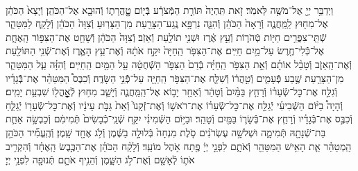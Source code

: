 \documentclass[twoside, openany, parskip=half, 11pt]{book}
\begin{document}
\begin{footnotesize}
\begin{multicols}{2}
\\
וַיְדַבֵּ֥ר יְיָ֖ אֶל־מֹשֶׁ֥ה לֵּאמֹֽר׃ זֹ֤את תִּֽהְיֶה֙ תּוֹרַ֣ת הַמְּֿצֹרָ֔ע בְּֿי֖וֹם טׇׇׇׇׇׇׇׇׇׇׇׇׇׇָֽהֳרָת֑וֹ וְֿהוּבָ֖א אֶל־הַכֹּהֵֽן׃ וְֿיָצָא֙ הַכֹּהֵ֔ן אֶל־מִח֖וּץ לַֽמַּֽחֲנֶ֑ה וְֿרָאָה֙ הַכֹּהֵ֔ן וְֿהִנֵּ֛ה נִרְפָּ֥א נֶֽגַע־הַצָּרַ֖עַת מִן־הַצָּרֽוּעַ׃ וְֿצִוָּה֙ הַכֹּהֵ֔ן וְֿלָקַ֧ח לַמִּטַּהֵ֛ר שְֿׁתֵּֽי־צִפֳּרִ֥ים חַיּ֖וֹת טְֿהֹר֑וֹת וְֿעֵ֣ץ אֶ֔רֶז וּשְׁנִ֥י תוֹלַ֖עַת וְֿאֵזֹֽב׃ וְֿצִוָּה֙ הַכֹּהֵ֔ן וְֿשָׁחַ֖ט אֶת־הַצִּפּ֣וֹר הָֽאֶחָ֑ת אֶל־כְּֿֿלִי־חֶ֖רֶשׂ עַל־מַ֥יִם חַיִּֽים׃  אֶת־הַצִּפֹּ֤ר הַֽחַיָּה֙ יִקַּ֣ח אֹתָ֔הּ וְֿאֶת־עֵ֥ץ הָאֶ֛רֶז וְֿאֶת־שְֿׁנִ֥י הַתּוֹלַ֖עַת וְֿאֶת־הָֽאֵזֹ֑ב וְֿטָבַ֨ל אוֹתָ֜ם וְֿאֵ֣ת הַצִּפֹּ֣ר הַֽחַיָּ֗ה בְּֿדַם֙ הַצִּפֹּ֣ר הַשְּֿׁחֻטָ֔ה עַ֖ל הַמַּ֥יִם הַֽחַיִּֽים׃ וְֿהִזָּ֗ה עַ֧ל הַמִּטַּהֵ֛ר מִן־הַצָּרַ֖עַת שֶׁ֣בַע פְּֿעָמִ֑ים וְֿטִ֣הֲר֔וֹ וְֿשִׁלַּ֛ח אֶת־הַצִּפֹּ֥ר הַֽחַיָּ֖ה עַל־פְּֿֿנֵ֥י הַשָּׂדֶֽה׃ וְֿכִבֶּס֩ הַמִּטַּהֵ֨ר אֶת־בְּֿֿגָדָ֜יו וְֿגִלַּ֣ח אֶת־כׇּל־שְֿׂעָר֗וֹ וְֿרָחַ֤ץ בַּמַּ֨יִם֙ וְֿטָהֵ֔ר וְֿאַחַ֖ר יָב֣וֹא אֶל־הַֽמַּֽחֲנֶ֑ה וְֿיָשַׁ֛ב מִח֥וּץ לְֿאׇׇׇׇׇׇׇׇׇׇָֽהֳל֖וֹ שִׁבְעַ֥ת יָמִֽים׃ וְֿהָיָה֩ בַיּ֨וֹם הַשְּֿׁבִיעִ֜י יְֿגַלַּ֣ח אֶת־כׇּל־שְֿׂעָר֗וֹ אֶת־רֹאשׁ֤וֹ וְֿאֶת־זְֿקָנוֹ֙ וְֿאֵת֙ גַּבֹּ֣ת עֵינָ֔יו וְֿאֶת־כׇּל־שְֿׂעָר֖וֹ יְֿגַלֵּ֑חַ וְֿכִבֶּ֣ס אֶת־בְּֿֿגָדָ֗יו וְֿרָחַ֧ץ אֶת־בְּֿֿשָׂר֛וֹ בַּמַּ֖יִם וְֿטָהֵֽר׃  וּבַיּ֣וֹם הַשְּֿׁמִינִ֗י יִקַּ֤ח שְֿׁנֵֽי־כְֿֿבָשִׂים֙ תְּֿמִימִ֔ם וְֿכַבְשָׂ֥ה אַחַ֛ת בַּת־שְֿׁנָתָ֖הּ תְּֿמִימָ֑ה וּשְׁלשָׁ֣ה עֶשְׂרֹנִ֗ים סֹ֤לֶת מִנְחָה֙ בְּֿלוּלָ֣ה בַשֶּׁ֔מֶן וְֿלֹ֥ג אֶחָ֖ד שָֽׁמֶן׃ וְֿהֶֽעֱמִ֞יד הַכֹּהֵ֣ן הַֽמְטַהֵ֗ר אֵ֛ת הָאִ֥ישׁ הַמִּטַּהֵ֖ר וְֿאֹתָ֑ם לִפְנֵ֣י יְיָ֔ פֶּ֖תַח אֹ֥הֶל מוֹעֵֽד׃ וְֿלָקַ֨ח הַכֹּהֵ֜ן אֶת־הַכֶּ֣בֶשׂ הָֽאֶחָ֗ד וְֿהִקְרִ֥יב אֹת֛וֹ לְֿאָשָׁ֖ם וְֿאֶת־לֹ֣ג הַשָּׁ֑מֶן וְֿהֵנִ֥יף אֹתָ֛ם תְּֿנוּפָ֖ה לִפְנֵ֥י יְיָ׃


\end{multicols}
\end{footnotesize}
\end{document}

